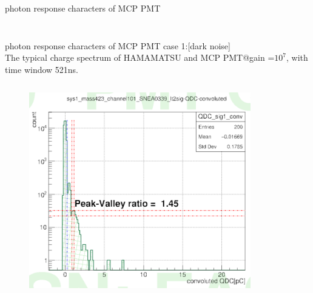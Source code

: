 \documentclass[11pt,compress,xcolor=x11names,UTF8]{beamer}
\begin{document}
\begin{frame}{photon response characters of MCP PMT }
\begin{columns}
\begin{column}{.5\textwidth}
\begin{figure}
\end{figure}
\end{column}
\end{columns}
\end{frame}
\begin{frame}{photon response characters of MCP PMT }
	case 1:[dark noise]\\ The typical  charge spectrum of HAMAMATSU and MCP PMT@gain =$10^7$, with time window 521ns. \\
\begin{columns}
\begin{column}{.485\textwidth}
\begin{figure}
\centering
\includegraphics[width=\textwidth]{figure/hamnoise.png} %
\end{figure}
\end{column}
\begin{column}{.5\textwidth}
\begin{figure}
\centering

\end{figure}
\end{column}
\end{columns}
\end{frame}
\end{document}
